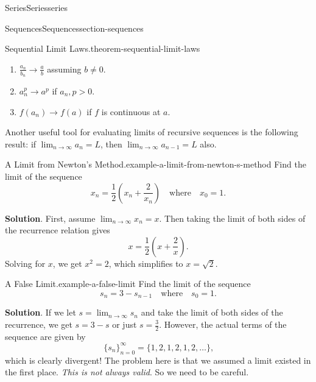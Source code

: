 \documentclass[oneside,10pt,]{book}
\numberwithin{equation}{section}
\newcommand{\gt}{>}
\begin{document}
\begin{chapterptx}{Series}{}{Series}{}{}{series}
\begin{sectionptx}{Sequences}{}{Sequences}{}{}{section-sequences}
\begin{theorem}{Sequential Limit Laws.}{}{theorem-sequential-limit-laws}
\begin{enumerate}
\item\hypertarget{li-85}{}\(\frac{a_{n}}{b_{n}}\to\frac{a}{b}\) assuming \(b\neq 0\).%
\item\hypertarget{li-86}{}\(a_{n}^{p}\to a^{p}\) if \(a_{n},p \gt 0\).%
\item\hypertarget{li-87}{}\(f(a_{n})\to f(a)\) if \(f\) is continuous at \(a\).%
\end{enumerate}
\end{theorem}
\hypertarget{p-809}{}%
Another useful tool for evaluating limits of recursive sequences is the following result: if \(\lim_{n\to\infty}a_{n} = L\), then \(\lim_{n\to\infty}a_{n-1} = L\) also.%
\begin{example}{A Limit from Newton's Method.}{example-a-limit-from-newton-s-method}%
\hypertarget{p-810}{}%
Find the limit of the sequence%
\begin{equation*}
x_{n} = \frac{1}{2}\left(x_{n} + \frac{2}{x_{n}}\right)\quad\text{where}\quad x_{0} = 1\text{.}
\end{equation*}
%
\par\smallskip%
\noindent\textbf{Solution}.\hypertarget{solution-167}{}\quad%
\hypertarget{p-811}{}%
First, assume \(\lim_{n\to\infty}x_{n} = x\). Then taking the limit of both sides of the recurrence relation gives%
\begin{equation*}
x = \frac{1}{2}\left(x + \frac{2}{x}\right)\text{.}
\end{equation*}
Solving for \(x\), we get \(x^{2} = 2\), which simplifies to \(x = \sqrt{2}\).%
\end{example}
\begin{example}{A False Limit.}{example-a-false-limit}%
\hypertarget{p-812}{}%
Find the limit of the sequence%
\begin{equation*}
s_{n} = 3 - s_{n - 1}\quad\text{where}\quad s_{0} = 1\text{.}
\end{equation*}
%
\par\smallskip%
\noindent\textbf{Solution}.\hypertarget{solution-168}{}\quad%
\hypertarget{p-813}{}%
If we let \(s = \lim_{n\to\infty}s_{n}\) and take the limit of both sides of the recurrence, we get \(s = 3 - s\) or just \(s = \frac{3}{2}\). However, the actual terms of the sequence are given by%
\begin{equation*}
\{s_{n}\}_{n=0}^{\infty} = \{1, 2, 1, 2, 1, 2, \ldots\}\text{,}
\end{equation*}
which is clearly divergent! The problem here is that we assumed a limit existed in the first place. \emph{This is not always valid}. So we need to be careful.%

\end{example}
\end{sectionptx}
\end{chapterptx}
\end{document}
